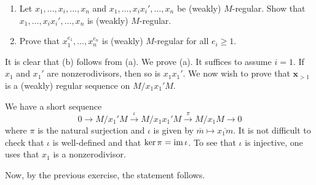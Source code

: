 \documentclass[12pt]{article}
\begin{document}
\begin{exe}
	\begin{enumerate}[label=(\alph*)]
		\item Let $x_{1}, \ldots, x_{i}, \ldots, x_{n}$ and $x_{1}, \ldots, x_{i} x_{i}', \ldots, x_{n}$ be (weakly) $M$-regular. Show that $x_{1}, \ldots, x_{i} x_{i}', \ldots, x_{n}$ is (weakly) $M$-regular.
		\item Prove that $x_{1}^{e_{1}}, \ldots, x_{n}^{e_{n}}$ is (weakly) $M$-regular for all $e_{i} \ge 1$.
	\end{enumerate}
\end{exe}
\begin{soln}
	It is clear that (b) follows from (a). We prove (a). It suffices to assume $i = 1$. \newline
	If $x_{1}$ and $x_{1}'$ are nonzerodivisors, then so is $x_{1} x_{1}'$. We now wish to prove that $\mathbf{x}_{> 1}$ is a (weakly) regular sequence on $M/x_{1} x_{1}' M$. 

	We have a short sequence
	\begin{equation*} 
		0 \to M/x_{1}'M \xrightarrow{\iota} M/x_{1} x_{1}' M \xrightarrow{\pi} M/x_{1} M \to 0
	\end{equation*}
	where $\pi$ is the natural surjection and $\iota$ is given by $\overline{m} \mapsto \overline{x_{1} m}$. It is not difficult to check that $\iota$ is well-defined and that $\ker \pi = \operatorname{im} \iota$. \newline
	To see that $\iota$ is injective, one uses that $x_{1}$ is a nonzerodivisor.

	Now, by the previous exercise, the statement follows.
\end{soln}
\end{document}
